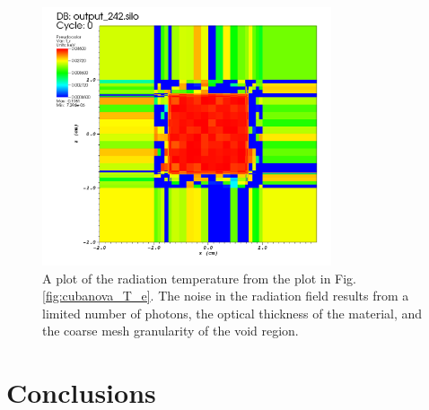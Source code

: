 \documentclass[]{article}
\begin{document}
	\begin{figure} [h!]
		\centering
		\includegraphics[height=3in]{Figures/cubanova_T_r.png}
		\caption{A plot of the radiation temperature from the plot in Fig. \ref{fig:cubanova_T_e}. The noise in the radiation field results from a limited number of photons, the optical thickness of the material, and the coarse mesh granularity of the void region.}
		\label{fig:cubanova_T_r}
	\end{figure}


\section{Conclusions}
\end{document}
